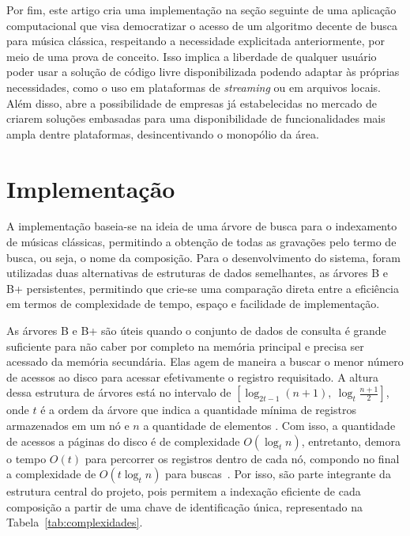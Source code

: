 \documentclass[12pt]{article}
\begin{document}
Por fim, este artigo cria uma implementação na seção seguinte de uma aplicação
computacional que visa democratizar o acesso de um algoritmo decente de busca
para música clássica, respeitando a necessidade explicitada anteriormente, por
meio de uma prova de conceito. Isso implica a liberdade de qualquer usuário
poder usar a solução de código livre disponibilizada podendo adaptar às próprias
necessidades, como o uso em plataformas de \emph{streaming} ou em arquivos
locais. Além disso, abre a possibilidade de empresas já estabelecidas no mercado
de criarem soluções embasadas para uma disponibilidade de funcionalidades mais
ampla dentre plataformas, desincentivando o monopólio da área.

\section{Implementação}

A implementação baseia-se na ideia de uma árvore de busca para o indexamento de
músicas clássicas, permitindo a obtenção de todas as gravações pelo termo de
busca, ou seja, o nome da composição. Para o desenvolvimento do sistema, foram
utilizadas duas alternativas de estruturas de dados semelhantes, as árvores B e
B\nolinebreak+ persistentes, permitindo que crie-se uma comparação direta entre
a eficiência em termos de complexidade de tempo, espaço e facilidade de
implementação.

As árvores B e B\nolinebreak+ são úteis quando o conjunto de dados de consulta é
grande suficiente para não caber por completo na memória principal e precisa ser
acessado da memória secundária. Elas agem de maneira a buscar o menor número de
acessos ao disco para acessar efetivamente o registro requisitado. A altura
dessa estrutura de árvores está no intervalo de $[\log_{2t-1} (n+1),\ \log_t
\frac{n + 1}{2}]$, onde $t$ é a ordem da árvore que indica a quantidade mínima
de registros armazenados em um nó e $n$ a quantidade de elementos
\cite{clrs:22}. Com isso, a quantidade de acessos a páginas do disco é de
complexidade $O(\log_t n)$, entretanto, demora o tempo $O(t)$ para percorrer os
registros dentro de cada nó, compondo no final a complexidade de $O(t \log_t n)$
para buscas~\cite{clrs:22,kpm:10}. Por isso, são parte integrante da estrutura
central do projeto, pois permitem a indexação eficiente de cada composição a
partir de uma chave de identificação única, representado na
Tabela~\ref{tab:complexidades}.
\end{document}
